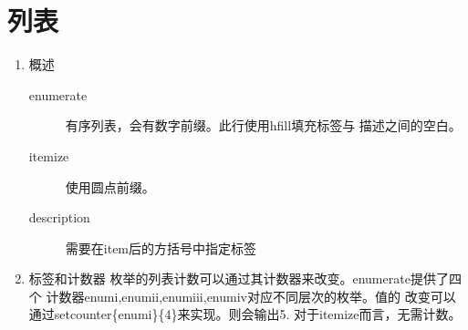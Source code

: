 \section{列表}
\begin{enumerate}
	\item{概述}
	\begin{description}
		\item[enumerate] \hfill
			有序列表，会有数字前缀。此行使用hfill填充标签与
			描述之间的空白。
		\item[itemize] 使用圆点前缀。
		\item[description] 需要在item后的方括号中指定标签
	\end{description}
	\setcounter{enumi}{4}
	\item{标签和计数器}
		枚举的列表计数可以通过其计数器来改变。enumerate提供了四个
		计数器enumi,enumii,enumiii,enumiv对应不同层次的枚举。值的
		改变可以通过setcounter\{enumi\}\{4\}来实现。则会输出5.
		对于itemize而言，无需计数。
\end{enumerate}
